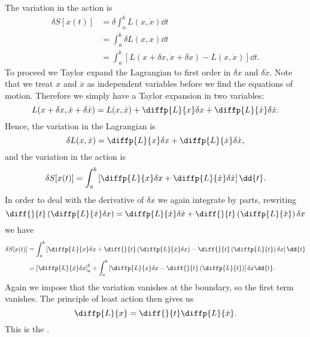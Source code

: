 \documentclass[fleqn]{NotesClass}
\newcommand*{\lagrangian}{L}
\begin{document}
    The variation in the action is
    \begin{align}
        \delta S[x(t)] &= \delta \int_a^b \lagrangian(x, \dot{x}) \dd{t}\\
        &= \int_a^b \delta \lagrangian (x, \dot{x})\dd{t}\\
        &= \int_a^b [\lagrangian(x + \delta x, \dot{x} + \delta\dot{x}) - \lagrangian(x, \dot{x})] \dd{t}.
    \end{align}
    To proceed we Taylor expand the Lagrangian to first order in \(\delta x\) and \(\delta \dot{x}\).
    Note that we treat \(x\) and \(\dot{x}\) as independent variables before we find the equations of motion.
    Therefore we simply have a Taylor expansion in two variables:
    \begin{equation}
        \lagrangian(x + \delta x, \dot{x} + \delta\dot{x}) = \lagrangian(x, \dot{x}) + \diffp{\lagrangian}{x}\delta x + \diffp{\lagrangian}{\dot{x}} \delta\dot{x}.
    \end{equation}
    Hence, the variation in the Lagrangian is
    \begin{equation}
        \delta \lagrangian(x, \dot{x}) = \diffp{\lagrangian}{x}\delta x + \diffp{\lagrangian}{\dot{x}}\delta \dot{x},
    \end{equation}
    and the variation in the action is
    \begin{equation}
        \delta S[x(t)] = \int_a^b \left[ \diffp{\lagrangian}{x}\delta x + \diffp{\lagrangian}{\dot{x}}\delta\dot{x} \right]\dd{t}.
    \end{equation}
    In order to deal with the derivative of \(\delta x\) we again integrate by parts, rewriting
    \begin{equation}
        \diff{}{t}\left( \diffp{\lagrangian}{\dot{x}} \delta x \right) = \diffp{\lagrangian}{\dot{x}}\delta\dot{x} + \diff{}{t}\left( \diffp{\lagrangian}{\dot{x}} \right)\delta x
    \end{equation}
    we have
    \begin{align}
        \delta S[x(t)] &= \int_a^b \left[ \diffp{\lagrangian}{x}\delta x + \diff{}{t}\left( \diffp{\lagrangian}{\dot{x}} \delta x \right) - \diff{}{t}\left( \diffp{\lagrangian}{t} \right) \delta x \right] \dd{t}\\
        &= \left[ \diffp{\lagrangian}{\dot{x}} \delta x \right]_a^b + \int_a^b \left[ \diffp{\lagrangian}{x}\delta x - \diff{}{t}\left( \diffp{\lagrangian}{t} \right) \right] \delta x \dd{t}.
    \end{align}
    Again we impose that the variation vanishes at the boundary, so the first term vanishes.
    The principle of least action then gives us
    \begin{equation}
        \diffp{\lagrangian}{x} = \diff{}{t}\diffp{\lagrangian}{\dot{x}}.
    \end{equation}
    This is the .
    
\end{document}
